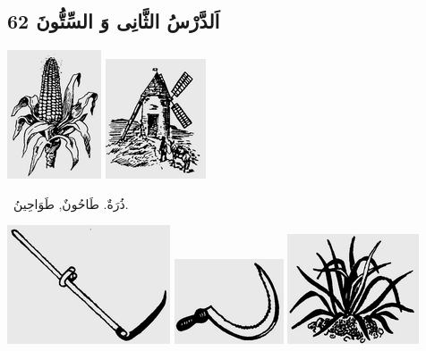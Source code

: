 \documentclass[a5paper]{article}
\begin{document}
\subsection[اَلدَّرْسُ الثَّانِى وَ السِّتُّونَ 62]{اَلدَّرْسُ الثَّانِى وَ السِّتُّونَ 62}
 \includegraphics[width=1.0937in,height=1.5in]{images/MuhammadBagauddinprettified-img199.png}   \includegraphics[width=1.1665in,height=1.3957in]{images/MuhammadBagauddinprettified-img200.png}  

\ ذُرَةٌ. طَاحُونٌ, طَوَاحِينُ. 

 \includegraphics[width=1.8957in,height=1.3854in]{images/MuhammadBagauddinprettified-img201.png}   \includegraphics[width=1.2709in,height=0.9898in]{images/MuhammadBagauddinprettified-img202.png}   \includegraphics[width=1.5311in,height=1.2811in]{images/MuhammadBagauddinprettified-img203.png} 
\end{document}
